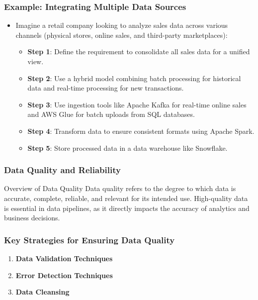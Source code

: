\documentclass{beamer}
\begin{document}
\begin{frame}[fragile]
    \frametitle{Example: Integrating Multiple Data Sources}
    \begin{itemize}
        \item Imagine a retail company looking to analyze sales data across various channels (physical stores, online sales, and third-party marketplaces):
        \begin{itemize}
            \item \textbf{Step 1}: Define the requirement to consolidate all sales data for a unified view.
            \item \textbf{Step 2}: Use a hybrid model combining batch processing for historical data and real-time processing for new transactions.
            \item \textbf{Step 3}: Use ingestion tools like Apache Kafka for real-time online sales and AWS Glue for batch uploads from SQL databases.
            \item \textbf{Step 4}: Transform data to ensure consistent formats using Apache Spark.
            \item \textbf{Step 5}: Store processed data in a data warehouse like Snowflake.
        \end{itemize}
    \end{itemize}
\end{frame}

\begin{frame}[fragile]
    \frametitle{Data Quality and Reliability}
    \begin{block}{Overview of Data Quality}
        Data quality refers to the degree to which data is accurate, complete, reliable, and relevant for its intended use. High-quality data is essential in data pipelines, as it directly impacts the accuracy of analytics and business decisions.
    \end{block}
\end{frame}

\begin{frame}[fragile]
    \frametitle{Key Strategies for Ensuring Data Quality}
    \begin{enumerate}
        \item \textbf{Data Validation Techniques}
        \item \textbf{Error Detection Techniques}
        \item \textbf{Data Cleansing}
    \end{enumerate}
\end{frame}
\end{document}
